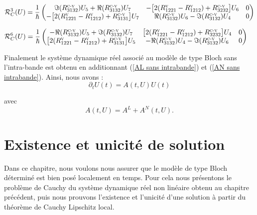 \documentclass[12pt,a4paper,openany,oneside]{book}
\begin{document}
{{{{{{\begin{eqnarray*}
\begin{split}
\mathcal{R}^{3}_{C}(U)&= \dfrac{1}{\hbar}
\begin{pmatrix}
\Im(R^{\textsc{c-v}}_{3132})U_{5}+\Re(R^{\textsc{c-v}}_{3132})U_{7} &
-\big[2(R^{\textsc{v}}_{1221}-R^{\textsc{v}}_{1212})+R^{\textsc{c-v}}_{3232}\big]U_{6} & 0 \\
-\big[2(R^{\textsc{v}}_{1221}-R^{\textsc{v}}_{1212})+R^{\textsc{c-v}}_{3131}\big]U_{7} & 
\Re(R^{\textsc{c-v}}_{3132})U_{6}- \Im(R^{\textsc{c-v}}_{3132})U_{4} & 0
\end{pmatrix}\\
\end{split}
\end{eqnarray*}

\begin{eqnarray*}
\begin{split}
\mathcal{R}^{6}_{C}(U)&= \dfrac{1}{\hbar}
\begin{pmatrix}
-\Re(R^{\textsc{c-v}}_{3132})U_{5}+\Im(R^{\textsc{c-v}}_{3132})U_{7} & \big[2(R^{\textsc{v}}_{1221}-R^{\textsc{v}}_{1212})+R^{\textsc{c-v}}_{3232}\big]U_{4} & 0 \\
\big[2(R^{\textsc{v}}_{1221}-R^{\textsc{v}}_{1212})+R^{\textsc{c-v}}_{3131}\big]U_{5} & -\Re(R^{\textsc{c-v}}_{3132})U_{4}- \Im(R^{\textsc{c-v}}_{3132})U_{6} & 0 
\end{pmatrix}
\end{split}
\end{eqnarray*}

Finalement le système dynamique réel associé au modèle de type Bloch sans l'intra-bande est obtenu en additionnant (\ref{AL sans intrabande}) et (\ref{AN sans intrabande}).
Ainsi, nous avons :
$$
\partial_{t}U(t) = A(t,U)U(t) 
$$

avec 
$$
A(t,U)= A^{L}+ A^{N}(t,U).
$$

\chapter{Existence et unicité de solution}

Dans ce chapitre, nous voulons nous assurer que le modèle de type Bloch déterminé est bien posé localement en temps.
Pour cela nous présentons le problème de Cauchy du système dynamique réel non linéaire obtenu au chapitre précédent, puis nous prouvons l'existence et l'unicité d'une solution à partir du théorème de Cauchy Lipschitz local.\\

}}}}}}
\end{document}
